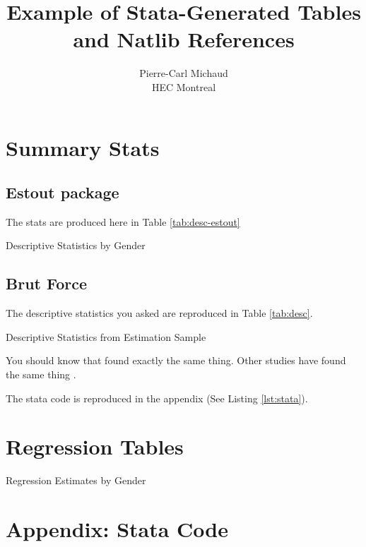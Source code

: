 \documentclass[11pt, oneside]{article}   	%
\title{Example of Stata-Generated Tables and Natlib References}
\author{Pierre-Carl Michaud \\ HEC Montreal}
\begin{document}
\maketitle

\section{Summary Stats}

\subsection{Estout package}

The stats are produced here in Table \ref{tab:desc-estout}

\begin{table}[htp]
  \centering
  
  \caption{Descriptive Statistics by Gender}
  \label{tab:desc-estout}
\end{table}

\subsection{Brut Force}
The descriptive statistics you asked are reproduced in Table \ref{tab:desc}. 

\begin{table}[htp]
\centering

\caption{Descriptive Statistics from Estimation Sample}
\label{tab:desc}
\end{table}

You should know that \citep{lusardi_financial_2007} found exactly the same thing. Other studies have found the same thing \citet{Lusardi2017OptimalInequality}.


The stata code is reproduced in the appendix (See Listing \ref{lst:stata}). 

\section{Regression Tables}

\begin{table}[htp]
  \centering
  
  \caption{Regression Estimates by Gender}
  \label{tab:reg-gender}
\end{table}




\newpage

\appendix

\section*{Appendix: Stata Code}

\end{document}
